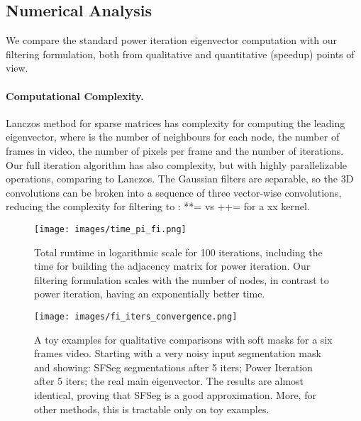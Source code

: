 \documentclass{article}
\begin{document}
\subsection{Numerical Analysis}
\label{subsec: numerical_complexity}
We compare the standard power iteration eigenvector computation with our filtering formulation, both from qualitative and quantitative (speedup) points of view.

\paragraph{Computational Complexity.} Lanczos  method for sparse matrices has  complexity for computing the leading eigenvector,
where  is the number of neighbours for each node,  the number of frames in video,  the number of pixels per frame and  the number of iterations. Our full iteration algorithm has also  complexity, but with highly parallelizable operations, comparing to Lanczos.  The Gaussian filters are separable, so the 3D convolutions can be broken into a sequence of three vector-wise convolutions, reducing the complexity  for filtering to : **= vs ++= for a xx kernel.

\begin{figure}[t]
	\begin{center}
		\texttt{[image: images/time\_pi\_fi.png]}
	\end{center}
    \caption{Total runtime in logarithmic scale for 100 iterations, including the time for building the adjacency matrix for power iteration. Our filtering formulation scales with the number of nodes, in contrast to power iteration, having an exponentially better time.}
    \label{fig: time_pi_fi}
\end{figure}


\begin{figure}[h]
	\begin{center}
	    \texttt{[image: images/fi\_iters\_convergence.png]}
	\end{center}
    \caption{A toy examples for qualitative comparisons with soft masks for a six frames video. Starting with a very noisy input segmentation mask and showing: SFSeg segmentations after 5 iters; Power Iteration after 5 iters; the real main eigenvector. The results are almost identical, proving that SFSeg is a good approximation. More, for other methods, this is tractable only on toy examples.}
    \label{fig: fi_iters}
\end{figure}
\end{document}
